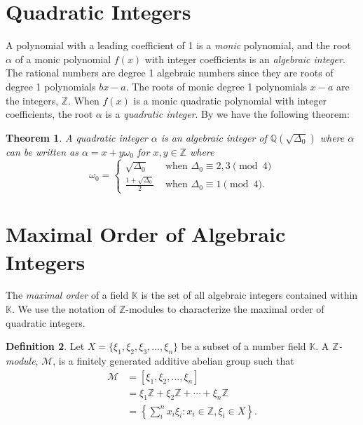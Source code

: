 \documentclass{ucalgthes1}
\theoremstyle{plain}
\newtheorem{thm}{Theorem}[section]
\theoremstyle{definition}
\newtheorem{defn}[thm]{Definition}
\newcommand{\KK}{\mathbb{K}}
\newcommand{\MM}{\mathcal{M}}
\newcommand{\ZZ}{\mathbb{Z}}
\newcommand{\QQ}{\mathbb{Q}}
\begin{document}
\bigbreak
\section{Quadratic Integers}

A polynomial with a leading coefficient of 1 is a \emph{monic} polynomial, and the root $\alpha$ of a monic polynomial $f(x)$ with integer coefficients is an \emph{algebraic integer}. The rational numbers are degree 1 algebraic numbers since they are roots of degree 1 polynomials $bx-a$.  The roots of monic degree 1 polynomials $x-a$ are the integers, $\ZZ$.  When $f(x)$ is a monic quadratic polynomial with integer coefficients, the root $\alpha$ is a \emph{quadratic integer}. By \cite[p.77]{Jacobson2009} we have the following theorem:

\begin{thm}
A quadratic integer $\alpha$ is an algebraic integer of $\QQ(\sqrt{\Delta_0})$ where $\alpha$ can be written as $\alpha = x + y \omega_0$ for $x, y \in \ZZ$ where
\begin{equation*}
	\omega_0 = \begin{cases}
		\sqrt{\Delta_0} & \textrm{ when } \Delta_0 \equiv 2, 3 \pmod 4 \\
		\frac{1+\sqrt{\Delta_0}}{2} & \textrm{ when } \Delta_0 \equiv 1 \pmod 4.
	\end{cases}
\end{equation*}
\end{thm}


\bigbreak
\section{Maximal Order of Algebraic Integers}

The \emph{maximal order} of a field $\KK$ is the set of all algebraic integers contained within $\KK$.  We use the notation of $\ZZ$-modules to characterize the maximal order of quadratic integers.


\begin{defn}
Let $X = \{ \xi_1, \xi_2, \xi_3, ..., \xi_n \}$ be a subset of a number field $\KK$.  A \emph{$\ZZ$\mbox{-}module}, $\MM$, is a finitely generated additive abelian group such that
\begin{align*}
	\MM &= [ \xi_1, \xi_2, ..., \xi_n ] \\
	& =  \xi_1 \ZZ + \xi_2 \ZZ + \cdots + \xi_n \ZZ \\
	& = \left \{ \sum_{i}^n x_i \xi_i : x_i \in \ZZ, \xi_i \in X \right \}.
\end{align*}
\end{defn}
\end{document}
